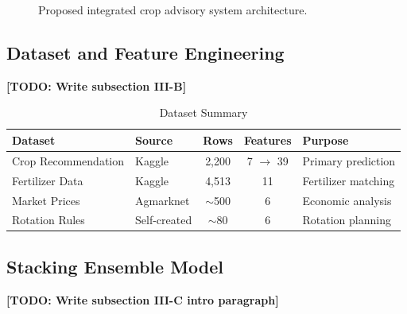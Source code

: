\documentclass[conference]{IEEEtran}
\begin{document}
\begin{figure}[htbp]
    \centering
    \caption{Proposed integrated crop advisory system architecture.}
    \label{fig:architecture}
\end{figure}

\subsection{Dataset and Feature Engineering}
\textbf{[TODO: Write subsection III-B]}

\begin{table}[htbp]
\caption{Dataset Summary}
\label{tab:datasets}
\centering
\renewcommand{\arraystretch}{1.2}
\begin{tabular}{|l|l|c|c|l|}
\hline
\textbf{Dataset}      & \textbf{Source}  & \textbf{Rows} & \textbf{Features} & \textbf{Purpose} \\
\hline
Crop Recommendation   & Kaggle           & 2,200         & 7 $\rightarrow$ 39 & Primary prediction \\
Fertilizer Data       & Kaggle           & 4,513         & 11                 & Fertilizer matching \\
Market Prices         & Agmarknet        & $\sim$500     & 6                  & Economic analysis \\
Rotation Rules        & Self-created     & $\sim$80      & 6                  & Rotation planning \\
\hline
\end{tabular}
\end{table}

\subsection{Stacking Ensemble Model}
\textbf{[TODO: Write subsection III-C intro paragraph]}
\end{document}
